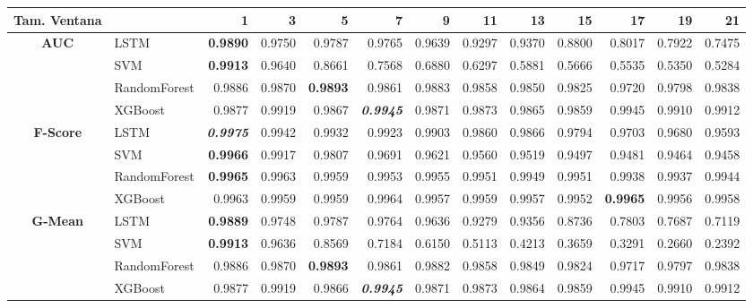 \begin{table}[H]
	\centering
	\begin{adjustbox}{max width=12cm}
		\begin{tabular}{|c|l|r|r|r|r|r|r|r|r|r|r|r|}
			\hline
			\textbf{Tam. Ventana}&         &      1  &      3  &      5  &      7  &      9  &      11 &      13 &      15 &      17 &      19 &      21 \\
			\hline
			\textbf{AUC} &  LSTM & \textbf{  0.9890 } &  0.9750 &  0.9787 &  0.9765 &  0.9639 &  0.9297 &  0.9370 &  0.8800 &  0.8017 &  0.7922 &  0.7475 \\
			&  SVM & \textbf{  0.9913 } &  0.9640 &  0.8661 &  0.7568 &  0.6880 &  0.6297 &  0.5881 &  0.5666 &  0.5535 &  0.5350 &  0.5284 \\
			&  RandomForest &  0.9886 &  0.9870 & \textbf{  0.9893 } &  0.9861 &  0.9883 &  0.9858 &  0.9850 &  0.9825 &  0.9720 &  0.9798 &  0.9838 \\
			&  XGBoost &  0.9877 &  0.9919 &  0.9867 & \textit{ \textbf{  0.9945 } } &  0.9871 &  0.9873 &  0.9865 &  0.9859 &  0.9945 &  0.9910 &  0.9912 \\
			\hline
			\textbf{F-Score} &  LSTM & \textit{ \textbf{  0.9975 } } &  0.9942 &  0.9932 &  0.9923 &  0.9903 &  0.9860 &  0.9866 &  0.9794 &  0.9703 &  0.9680 &  0.9593 \\
			&  SVM & \textbf{  0.9966 } &  0.9917 &  0.9807 &  0.9691 &  0.9621 &  0.9560 &  0.9519 &  0.9497 &  0.9481 &  0.9464 &  0.9458 \\
			&  RandomForest & \textbf{  0.9965 } &  0.9963 &  0.9959 &  0.9953 &  0.9955 &  0.9951 &  0.9949 &  0.9951 &  0.9938 &  0.9937 &  0.9944 \\
			&  XGBoost &  0.9963 &  0.9959 &  0.9959 &  0.9964 &  0.9957 &  0.9959 &  0.9957 &  0.9952 & \textbf{  0.9965 } &  0.9956 &  0.9958 \\
			\hline
			\textbf{G-Mean} &  LSTM & \textbf{  0.9889 } &  0.9748 &  0.9787 &  0.9764 &  0.9636 &  0.9279 &  0.9356 &  0.8736 &  0.7803 &  0.7687 &  0.7119 \\
			&  SVM & \textbf{  0.9913 } &  0.9636 &  0.8569 &  0.7184 &  0.6150 &  0.5113 &  0.4213 &  0.3659 &  0.3291 &  0.2660 &  0.2392 \\
			&  RandomForest &  0.9886 &  0.9870 & \textbf{  0.9893 } &  0.9861 &  0.9882 &  0.9858 &  0.9849 &  0.9824 &  0.9717 &  0.9797 &  0.9838 \\
			&  XGBoost &  0.9877 &  0.9919 &  0.9866 & \textit{ \textbf{  0.9945 } } &  0.9871 &  0.9873 &  0.9864 &  0.9859 &  0.9945 &  0.9910 &  0.9912 \\

\end{tabular}
\end{adjustbox}
\end{table}
